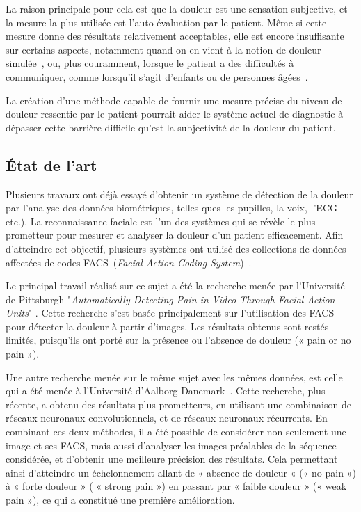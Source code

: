 \documentclass[11pt]{article}
\begin{document}
La raison principale pour cela est  que la douleur est une sensation subjective,
et la  mesure la plus  utilisée est l’auto-évaluation  par le patient.   Même si
cette  mesure donne  des  résultats relativement  acceptables,  elle est  encore
insuffisante sur  certains aspects, notamment quand  on en vient à  la notion de
douleur simulée~\cite{gwen2007faces}, ou, plus  couramment, lorsque le patient a
des difficultés à communiquer, comme  lorsqu’il s’agit d’enfants ou de personnes
âgées~\cite{lucey2011automatically}.

La création  d’une méthode capable  de fournir une  mesure précise du  niveau de
douleur ressentie par le patient pourrait  aider le système actuel de diagnostic
à dépasser  cette barrière  difficile qu'est  la subjectivité  de la  douleur du
patient.


\subsection{\'Etat de l'art}
\label{sec:org08f9dfb}

Plusieurs travaux  ont d\'ej\`a essayé d’obtenir  un système de détection  de la
douleur par  l’analyse des  données biométriques, telles  ques les  pupilles, la
voix, l'ECG etc.). La reconnaissance faciale est l'un des systèmes qui se révèle
le  plus   prometteur  pour  mesurer   et  analyser  la  douleur   d'un  patient
efficacement.  Afin d’atteindre cet objectif, plusieurs systèmes ont utilisé des
collections  de données  affectées  de codes  FACS~(\emph{Facial Action  Coding
  System})~\cite{lucey2011painful}.

Le  principal  travail  réalisé sur  ce  sujet  a  été  la recherche  menée  par
l’Université de Pittsburgh "\emph{Automatically  Detecting Pain in Video Through
  Facial  Action Units}"  \cite{lucey2011automatically}.  Cette  recherche s’est
basée  principalement sur  l’utilisation des  FACS  pour détecter  la douleur  à
partir d'images. Les résultats obtenus sont restés limités, puisqu'ils ont porté
sur la présence ou l’absence de douleur (« pain or no pain »).

Une autre recherche  menée sur le même  sujet avec les mêmes  données, est celle
qui        a       été        menée        à       l’Université        d’Aalborg
Danemark~\cite{bellantonio2016spatio}. Cette  recherche, plus récente,  a obtenu
des  résultats  plus  prometteurs,  en  utilisant  une  combinaison  de  réseaux
neuronaux convolutionnels, et de réseaux neuronaux récurrents.  En combinant ces
deux méthodes, il  a été possible de  considérer non seulement une  image et ses
FACS, mais aussi d’analyser les images  préalables de la séquence considérée, et
d’obtenir  une   meilleure  précision  des  résultats.   Cela  permettant  ainsi
d’atteindre un échelonnement allant de « absence de  douleur « (« no pain ») à «
forte douleur » ( « strong pain ») en  passant par « faible douleur » (« weak pain
»), ce qui a constitué une première amélioration.
\end{document}
